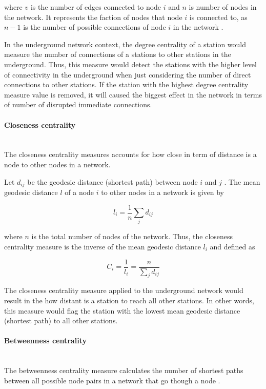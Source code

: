 \documentclass{article}
\begin{document}
where $v$ is the number of edges connected to node $i$ and $n$ is number of nodes in the network. It represents the faction of nodes that node $i$ is connected to, as $n-1$ is the number of possible connections of node $i$ in the network \citep{hagbergExploringNetworkStructure2008}.

In the underground network context, the degree centrality of a station would measure the number of connections of a stations to other stations in the underground. Thus, this measure would detect the stations with the higher level of connectivity in the underground when just considering the number of direct connections to other stations. If the station with the highest degree centrality measure value is removed, it will caused the biggest effect in the network in terms of number of disrupted immediate connections.


\paragraph{Closeness centrality}\mbox{}\\ 

The closeness centrality measures accounts for how close in term of distance is a node to other nodes in a network.

Let $d_{ij}$ be the geodesic distance (shortest path) between node $i$ and $j$ \citep{marinReviewCentralityMeasures2022}. The mean geodesic distance $l$ of a node $i$ to other nodes in a network is given by
    
\[l_{i}=\frac{1}{n} \sum_{j} d_{ij}\]
    
where $n$ is the total number of nodes of the network. Thus, the closeness centrality measure is the inverse of the mean geodesic distance $l_{i}$ and defined as

\[C_{i}= \frac{1}{l_{i}} = \frac{n}{\sum_{j} d_{ij}}\]

The closeness centrality measure applied to the underground network would result in the how distant is a station to reach all other stations. In other words, this measure would flag the station with the lowest mean geodesic distance (shortest path) to all other stations.


\paragraph{Betweenness centrality}\mbox{}\\

The betweenness centrality measure calculates the number of shortest paths between all possible node pairs in a network that go though a node \citep{arcauteNetworksUrbanSimulation2023}.
\end{document}
